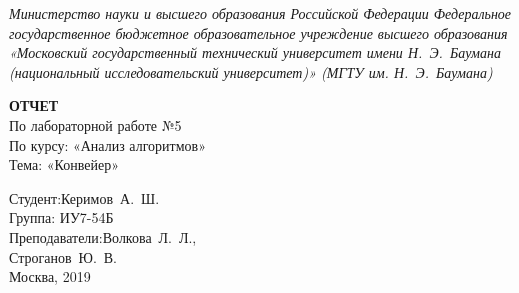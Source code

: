 \begin{titlepage}
	\centering

	{\footnotesize\itshape Министерство науки и высшего образования
	Российской Федерации Федеральное государственное бюджетное
	образовательное учреждение высшего образования «Московский
	государственный технический университет имени Н.~Э.~Баумана
	(национальный исследовательский университет)» (МГТУ им. Н.~Э.~Баумана)
	\\}

	\vspace{60mm}

	\textbf{ОТЧЕТ}\\
	По лабораторной работе №5\\
	По курсу: «Анализ алгоритмов»\\
	Тема: «Конвейер»\\

	\vspace{60mm}

	\hspace{70mm} Студент:\hfill Керимов~А.~Ш.\\
	\hspace{70mm} Группа: \hfill ИУ7-54Б\\
	\hspace{70mm} Преподаватели:\hfill Волкова~Л.~Л.,\\
	                            \hfill Строганов~Ю.~В.\\

	\vfill
	Москва, 2019
\end{titlepage}
